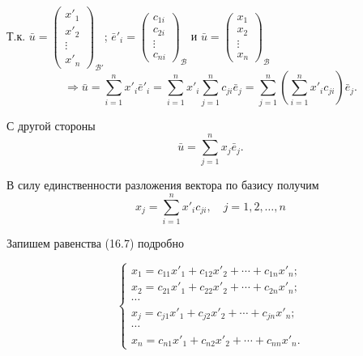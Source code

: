 \documentclass[12pt,a4paper]{article}
\newcommand{\vu}{\bar u}
\newcommand{\ve}{\bar e}
\begin{document}
Т.к. $\vu =
\begin{pmatrix} x'_1 \\ x'_2 \\ \vdots \\ x'_n
\end{pmatrix}_{\mathcal{B}'}$; $\ve'_i =
\begin{pmatrix} c_{1i} \\ c_{2i} \\ \vdots \\ c_{ni}
\end{pmatrix}_{\mathcal{B}}$ и $\vu =
\begin{pmatrix} x_1 \\ x_2 \\ \vdots \\ x_n
\end{pmatrix}_{\mathcal{B}}$
$$
\Rightarrow \vu = \sum_{i=1}^n x'_i \ve'_i = \sum_{i=1}^n x'_i
\sum_{j=1}^n c_{ji} \ve_j = \sum_{j=1}^n \left( \sum_{i=1}^n x'_i
c_{ji} \right) \ve_j.
$$

С другой стороны
$$
\vu = \sum_{j=1}^n x_j \ve_j.
$$

В силу единственности разложения вектора по базису получим
\begin{equation}
x_j = \sum_{i=1}^n x'_i c_{ji}, \quad j = 1, 2, \ldots, n \tag{16.7}
\end{equation}

Запишем равенства (16.7) подробно

\begin{equation}
\begin{cases}
x_1 = c_{11} x'_1 + c_{12} x'_2 + \cdots + c_{1n} x'_n;\\
x_2 = c_{21} x'_1 + c_{22} x'_2 + \cdots + c_{2n} x'_n;\\
\cdots\\
x_j = c_{j1} x'_1 + c_{j2} x'_2 + \cdots + c_{jn} x'_n;\\
\cdots\\
x_n = c_{n1} x'_1 + c_{n2} x'_2 + \cdots + c_{nn} x'_n.
\end{cases}
\tag{16.8}
\end{equation}
\end{document}
